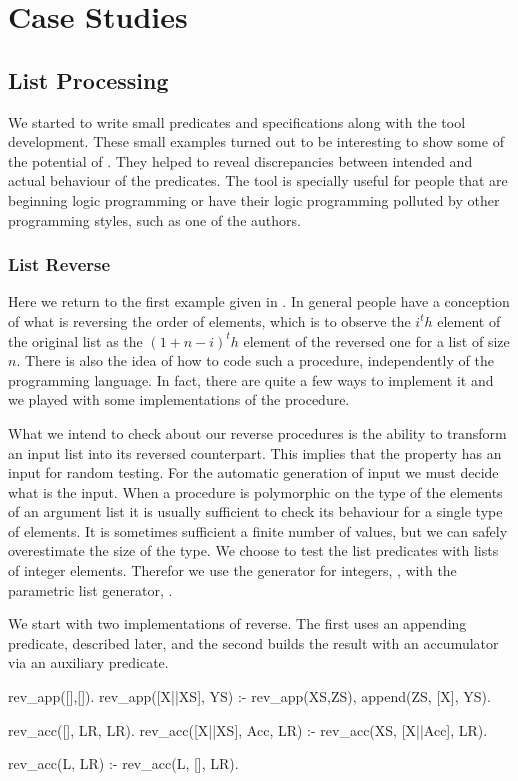 
\section{Case Studies}
\label{sec:case-studies}

\subsection{List Processing}
We started to write small predicates and specifications along with the
tool development.
%
These small examples turned out to be interesting to show some of the
potential of \plqc{}.
%
They helped to reveal discrepancies between intended and actual
behaviour of the predicates.
%
The tool is specially useful for people that are beginning logic
programming or have their logic programming polluted by other
programming styles, such as one of the authors.


\subsubsection{List Reverse}
Here we return to the first example given in .
%
In general people have a conception of what is reversing the order of
elements, which is to observe the $i^th$ element of the original list as
the $(1+n-i)^th$ element of the reversed one for a list of size $n$.
%
There is also the idea of how to code such a procedure, independently of
the programming language.
%
In fact, there are quite a few ways to implement it and we played with
some implementations of the procedure.


What we intend to check about our reverse procedures is the ability to
transform an input list into its reversed counterpart.
%
This implies that the property has an input for random testing.
%
For the automatic generation of input we must decide what is the input.
%
When a procedure is polymorphic on the type of the elements of an
argument list it is usually sufficient to check its behaviour for a
single type of elements.
%
It is sometimes sufficient a finite number of values, but we can
safely overestimate the size of the type.
%
We choose to test the list predicates with lists of integer elements.
%
Therefor we use the generator for integers, , with the
parametric list generator, .


We start with two implementations of reverse.
%
The first uses an appending predicate, described later, and the second
builds the result with an accumulator via an auxiliary predicate.
%
\begin{yapcode}
 rev_app([],[]).
 rev_app([X||XS], YS) :-
   rev_app(XS,ZS), append(ZS, [X], YS).

 rev_acc([], LR, LR).
 rev_acc([X||XS], Acc, LR) :-
   rev_acc(XS, [X||Acc], LR).

 rev_acc(L, LR) :-
   rev_acc(L, [], LR).
\end{yapcode}




